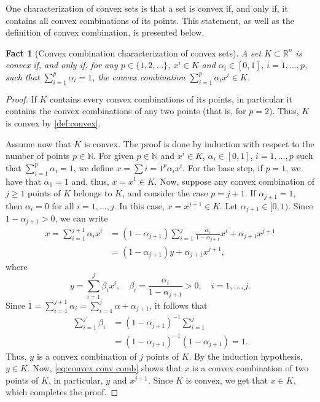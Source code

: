 \documentclass[smallextended,numbook,nospthms]{svjour3}
\theoremstyle{plain}
\newtheorem{fact}[theorem]{Fact}
\theoremstyle{definition}
\def\RR{\mathds R}
\def\NN{\mathds N}
\begin{document}
One characterization of convex sets is that a set is convex if, and only if, it contains all convex combinations of its points. This statement, as well as the definition of convex combination, is presented below.
\begin{fact}[Convex combination characterization of convex sets]\label{fact:convex conv comb}
	A set $K \subset \RR^n$ is convex if, and only if, for any $p \in \{1,2,\ldots\}$, $x^{i} \in K$ and $\alpha_{i} \in [0,1]$, $i=1,\ldots,p$, such that $\sum_{i=1}^{p}\alpha_{i}=1$, the \emph{convex combination} $\sum_{i=1}^{p} \alpha_{i}x^{i} \in K$.
\end{fact}
\begin{proof}
	If $K$ contains every convex combinations of its points, in particular it contains the convex combinations of any two points (that is, for $p=2$). Thus, $K$ is convex by \cref{def:convex}.
	
	Assume now that $K$ is convex. The proof is done by induction with respect to the number of points $p \in \NN$. For given $p \in \NN$ and $x^{i} \in K$, $\alpha_{i} \in [0,1]$, $i=1,\ldots,p$ such that $\sum_{i=1}^{p} \alpha_{i}=1$, we define $x=\sum{i=1}^{p} \alpha_{i}x^{i}$.
	For the base step, if $p=1$, we have that $\alpha_{1}=1$ and, thus, $x=x^{1} \in K$.
	Now, suppose any convex combination of $j \geq 1$ points of $K$ belongs to $K$, and consider the case $p=j+1$.
	If $\alpha_{j+1}=1$, then $\alpha_{i}=0$ for all $i=1,\ldots,j$. In this case, $x=x^{j+1} \in K$.
	Let $\alpha_{j+1} \in [0,1)$. Since $1-\alpha_{j+1}>0$, we can write
	\begin{align}
		x = \sum_{i=1}^{j+1} \alpha_{i}x^{i} &= (1-\alpha_{j+1})\sum_{i=1}^{j} \frac{\alpha_{i}}{1-\alpha_{j+1}}x^{i} + \alpha_{j+1}x^{j+1} \\
		  &= (1-\alpha_{j+1})y + \alpha_{j+1}x^{j+1}, \label{eq:convex conv comb}
	\end{align}
	where
	\[
	y=\sum_{i=1}^{j}\beta_{i}x^{i}, \quad \beta_{i}=\frac{\alpha_{i}}{1-\alpha_{j+1}}>0, \quad i=1,\ldots,j.
	\]
	Since $1=\sum_{i=1}^{j+1}\alpha_{i}=\sum_{i=1}^{j}\alpha + \alpha_{j+1}$, it follows that
	\begin{align}
		\sum_{i=1}^{j} \beta_{i} &= \left(1-\alpha_{j+1}\right)^{-1}\sum_{i=1}^{j} \\
			&= \left(1-\alpha_{j+1}\right)^{-1}\left(1-\alpha_{j+1}\right)=1.
	\end{align}
	Thus, $y$ is a convex combination of $j$ points of $K$. By the induction hypothesis, $y \in K$. Now, \cref{eq:convex conv comb} shows that $x$ is a convex combination of two points of $K$, in particular, $y$ and $x^{j+1}$. Since $K$ is convex, we get that $x \in K$, which completes the proof.
\end{proof}
\end{document}
